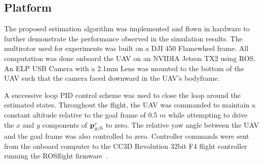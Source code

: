 
\subsection{Platform}
The proposed estimation algorithm was implemented and flown in
hardware to further demonstrate the performance observed in the simulation
results. The multirotor used for experiments was built on a DJI 450 Flamewheel
frame. All computation was done onboard the UAV on an NVIDIA Jetson TX2 using
ROS. An ELP
USB Camera with a 2.1mm Lens was mounted to the bottom of the UAV such that the
camera faced downward in the UAV's bodyframe.

A successive loop PID control scheme was used to close the loop around the
estimated states. Throughout the flight, the UAV was commanded to maintain a
constant altitude relative to the goal frame of 0.5 $m$ while attempting to
drive the $x$ and $y$ components of $\boldsymbol{\mathrm{p}}_{g/b}^v$ to zero. The relative yaw
angle between the UAV and the goal frame was also controlled to zero.
Controller commands were sent from
the onboard computer to the CC3D Revolution 32bit F4 flight controller running
the ROSflight firmware~\cite{jackson2016rosflight}.

